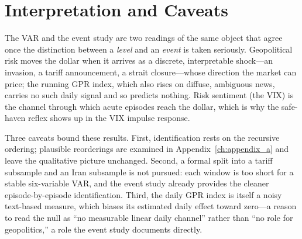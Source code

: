 \section{Interpretation and Caveats}
\label{sec:svar_subsample}

The VAR and the event study are two readings of the same object that agree once the
distinction between a \emph{level} and an \emph{event} is taken seriously. Geopolitical risk
moves the dollar when it arrives as a discrete, interpretable shock---an invasion, a tariff
announcement, a strait closure---whose direction the market can price; the running GPR
index, which also rises on diffuse, ambiguous news, carries no such daily signal and so
predicts nothing. Risk sentiment (the VIX) is the channel through which acute episodes reach
the dollar, which is why the safe-haven reflex shows up in the VIX impulse response.

Three caveats bound these results. First, identification rests on the recursive ordering;
plausible reorderings are examined in Appendix~\ref{ch:appendix_a} and leave the
qualitative picture unchanged. Second, a formal split into a tariff subsample and an Iran
subsample is not pursued: each window is too short for a stable six-variable VAR, and the
event study already provides the cleaner episode-by-episode identification. Third, the daily
GPR index is itself a noisy text-based measure, which biases its estimated daily effect
toward zero---a reason to read the null as ``no measurable linear daily channel'' rather
than ``no role for geopolitics,'' a role the event study documents directly.
